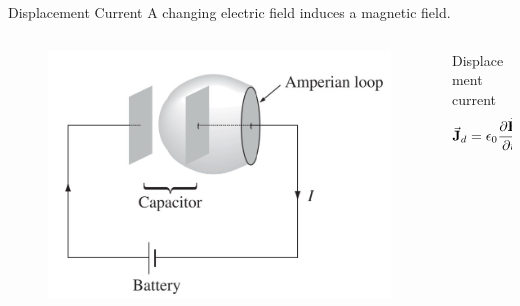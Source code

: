\documentclass{beamer}
\begin{document}
\begin{frame}{Displacement Current}
    A changing electric field induces a magnetic field.

    \begin{columns}
        \begin{column}{0.5\textwidth}
            \begin{figure}[htbp]
                \centering
                \includegraphics[width=\textwidth]{Images/amp.jpg}
            \end{figure}
        \end{column}
        \begin{column}{0.5\textwidth}
            \begin{block}{Displacement current}
                \begin{equation}
                    \va{J}_d = \epsilon_0 \pdv{\va{E}}{t}
                \end{equation}
            \end{block}
        \end{column}
    \end{columns}
\end{frame}
\end{document}
